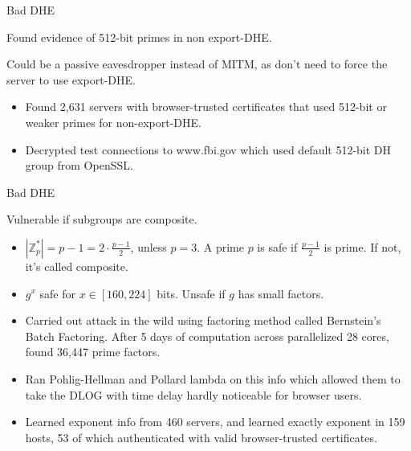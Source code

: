 \documentclass[presentation, aspectratio=54]{beamer}
\begin{document}
\begin{frame}{Bad DHE}
    
Found evidence of 512-bit primes in non export-DHE. 

Could be a passive eavesdropper instead of MITM, as don't need to force the
server to use export-DHE. 
\begin{itemize}
\item Found 2,631 servers with browser-trusted certificates that used 512-bit
      or weaker primes for non-export-DHE.
\item Decrypted test connections to www.fbi.gov which used default 512-bit DH
      group from OpenSSL.
\end{itemize}

\end{frame}


\begin{frame}{Bad DHE}

Vulnerable if subgroups are composite.
\begin{itemize}
\item $|\mathbb{Z}_p^*| = p-1 = 2 \cdot \frac{p-1}{2}$, unless $p =3$. A prime
      $p$ is safe if $\frac{p-1}{2}$ is prime. If not, it's called composite.
\item $g^x$ safe for $x \in [160, 224]$ bits. Unsafe if $g$ has small factors.
\item Carried out attack in the wild using factoring method called Bernstein's
      Batch Factoring. After 5 days of computation across parallelized 28 cores,
      found 36,447 prime factors.
\item Ran Pohlig-Hellman and Pollard lambda on this info which allowed them to
      take the DLOG with time delay hardly noticeable for browser users.
\item Learned exponent info from 460 servers, and learned exactly exponent in
      159 hosts, 53 of which authenticated with valid browser-trusted
      certificates.
\end{itemize}

\end{frame}

\end{document}
